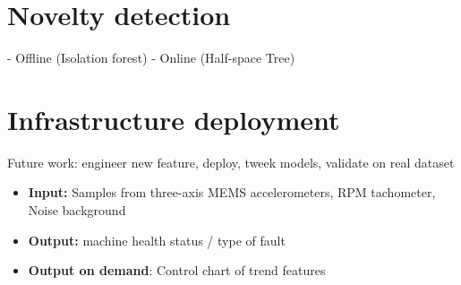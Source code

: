 \section{Novelty detection}
- Offline (Isolation forest)
- Online (Half-space Tree)


\section{Infrastructure deployment}
Future work: engineer new feature, deploy, tweek models, validate on real dataset

 \begin{itemize}
 \itemsep0pt
\item \textbf{Input:} Samples from three-axis MEMS accelerometers, RPM tachometer, Noise background
\item \textbf{Output:} machine health status / type of fault
\item \textbf{Output on demand}: Control chart of trend features
\end{itemize}

